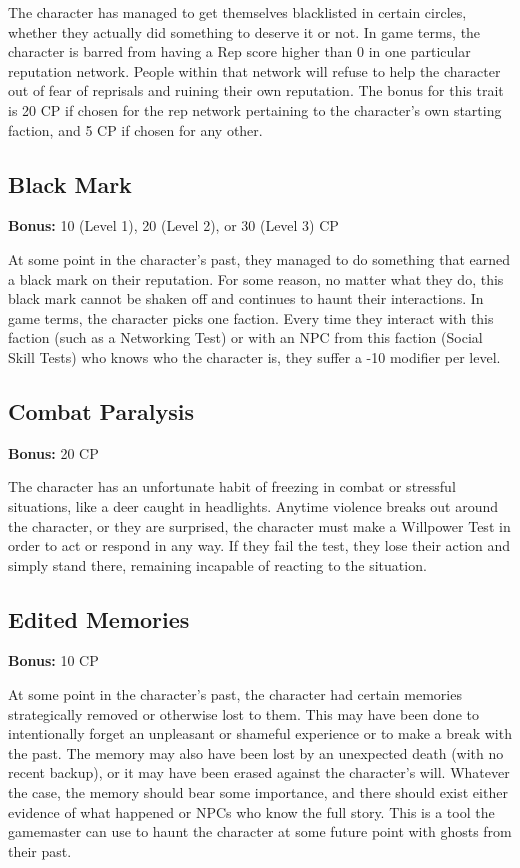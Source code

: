 The character has managed to get themselves blacklisted in certain circles, whether they actually did something to deserve it or not. In game terms, the character is barred from having a Rep score higher than 0 in one particular reputation network. People within that network will refuse to help the character out of fear of reprisals and ruining their own reputation. The bonus for this trait is 20 CP if chosen for the rep network pertaining to the character’s own starting faction, and 5 CP if chosen for any other. 

\subsection{Black Mark} \label{sec:traits-black-mark} 

\textbf{Bonus:} 10 (Level 1), 20 (Level 2), or 30 (Level 3) CP 

At some point in the character’s past, they managed to do something that earned a black mark on their reputation. For some reason, no matter what they do, this black mark cannot be shaken off and continues to haunt their interactions. In game terms, the character picks one faction. Every time they interact with this faction (such as a Networking Test) or with an NPC from this faction (Social Skill Tests) who knows who the character is, they suffer a -10 modifier per level. 

\subsection{Combat Paralysis} \label{sec:traits-combat-paralysis} 

\textbf{Bonus:} 20 CP 

The character has an unfortunate habit of freezing in combat or stressful situations, like a deer caught in headlights. Anytime violence breaks out around the character, or they are surprised, the character must make a Willpower Test in order to act or respond in any way. If they fail the test, they lose their action and simply stand there, remaining incapable of reacting to the situation. 

\subsection{Edited Memories} \label{sec:traits-edited-memories} 

\textbf{Bonus:} 10 CP 

At some point in the character’s past, the character had certain memories strategically removed or otherwise lost to them. This may have been done to intentionally forget an unpleasant or shameful experience or to make a break with the past. The memory may also have been lost by an unexpected death (with no recent backup), or it may have been erased against the character’s will. Whatever the case, the memory should bear some importance, and there should exist either evidence of what happened or NPCs who know the full story. This is a tool the gamemaster can use to haunt the character at some future point with ghosts from their past. 

